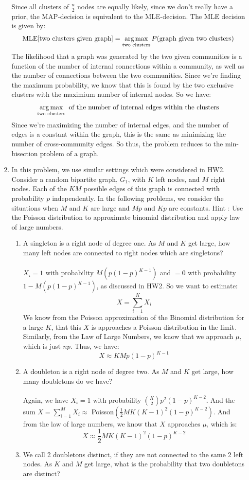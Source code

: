 \begin{enumerate}
    Since all clusters of $\frac{n}{2}$ nodes are equally likely, since we don't really have a prior, the MAP-decision is equivalent to the MLE-decision. The MLE decision is given by:
    $$\text{MLE[two clusters given graph]} = \operatorname*{arg\,max}_{\text{two clusters}} P(\text{graph given two clusters})$$
    The likelihood that a graph was generated by the two given communities is a function of the number of internal connections within a community, as well as the number of connections between the two communities. Since we're finding the maximum probability, we know that this is found by the two exclusive clusters with the maximium number of internal nodes. So we have:
    $$\operatorname*{arg\,max}_{\text{two clusters}} \text{ of the number of internal edges within the clusters}$$
    Since we're maximizing the number of internal edges, and the number of edges is a constant within the graph, this is the same as minimizing the number of cross-community edges. So thus, the problem reduces to the min-bisection problem of a graph.
  \item In this problem, we use similar settings which were considered in HW2. Consider a random bipartite graph, $G_1$, with $K$ left nodes, and $M$ right nodes. Each of the $KM$ possible edges of this graph is connected with probability $p$ independently. In the following problems, we consider the situations when $M$ and $K$ are large and $Mp$ and $Kp$ are constants. Hint : Use the Poisson distribution to approximate binomial distribution and apply law of large numbers.
    \begin{enumerate}
      \item A singleton is a right node of degree one. As $M$ and $K$ get large, how many left nodes are connected to right nodes which are singletons?\\\\
        $X_i = 1$ with probability $M(p(1-p)^{K-1})$ and $= 0$ with probability $1 - M(p(1-p)^{K-1})$, as discussed in HW2. So we want to estimate:
        $$X = \sum_{i=1}^K X_i$$
        We know from the Poisson approximation of the Binomial distribution for a large $K$, that this $X$ is approaches a Poisson distribution in the limit. Similarly, from the Law of Large Numbers, we know that we approach $\mu$, which is just $np$. Thus, we have:
        $$X \approx KMp(1-p)^{K-1}$$
      \item A doubleton is a right node of degree two. As $M$ and $K$ get large, how many doubletons do we have?\\\\

        Again, we have $X_i = 1$ with probability $\binom{K}{2} p^2 (1-p)^{K-2}$. And the sum $X = \sum_{i=1}^M X_i \approx$ Poisson$(\frac{1}{2}MK(K-1)^2(1-p)^{K-2})$. And from the law of large numbers, we know that $X$ approaches $\mu$, which is:
        $$X \approx \frac{1}{2}MK(K-1)^2(1-p)^{K-2}$$
      \item We call 2 doubletons distinct, if they are not connected to the same 2 left nodes. As $K$ and $M$ get large, what is the probability that two doubletons are distinct?
    \end{enumerate}
\end{enumerate}


